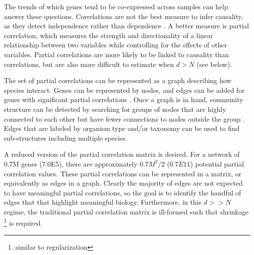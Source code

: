 The trends of which genes tend to be co-expressed across samples can help answer these questions.
Correlations are not the best measure to infer causality, as they detect independence rather than dependence \cite{schafer2005}.
A better measure is partial correlation, which measures the strength and directionality of a linear relationship between two variables while controlling for the effects of other variables.
Partial correlations are more likely to be linked to causality than correlations, but are also more difficult to estimate when $d > N$ (see below). %

The set of partial correlations can be represented as a graph describing how species interact.
Genes can be represented by nodes, and edges can be added for genes with significant partial correlations \cite{borthagaray2014}.
Once a graph is in hand, community structure can be detected by searching for groups of nodes that are highly connected to each other but have fewer connections to nodes outside the group \cite{hero2012}.
Edges that are labeled by organism type and/or taxonomy can be used to find sub-structures including multiple species.

A reduced version of the partial correlation matrix is desired.
For a network of 0.7M genes (7.0E5), there are approximately 0$.7M^2/2$ ($0.7E11$) potential partial correlation values. %
These partial correlations can be represented in a matrix, or equivalently as edges in a graph.
Clearly the majority of edges are not expected to have meaningful partial correlations, so the goal is to identify the handful of edges that that highlight meaningful biology.
Furthermore, in this $d >> N$ regime, the traditional partial correlation matrix is ill-formed \cite{whittaker2009} such that shrinkage \footnote{similar to regularization} is required.

